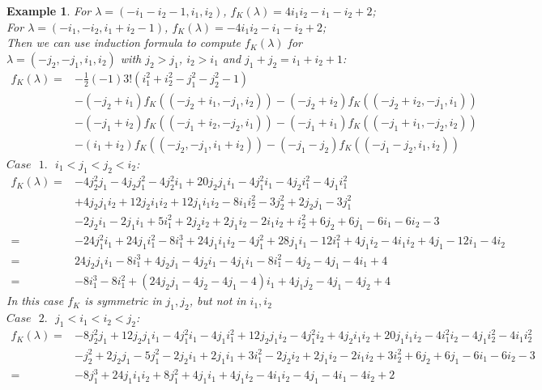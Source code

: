 \documentclass{article}
\newtheorem{example}{Example}[theorem]
\begin{document}
\begin{example}
For $\lambda = (-i_1-i_2-1,i_1,i_2)$, $f_K(\lambda) = 4i_1i_2-i_1-i_2+2$;\\
For $\lambda = (-i_1, -i_2,i_1+i_2-1)$,  $f_K(\lambda) = -4i_1i_2-i_1-i_2+2$;\\
Then we can use induction formula to compute $f_K(\lambda)$ for $\lambda = (-j_2, -j_1, i_1, i_2)$ with $j_2>j_1$, $i_2>i_1$ and $j_1+j_2=i_1+i_2+1$:
\[
\begin{aligned}
f_K(\lambda) = &-\frac{1}{2}(-1)3!(i_1^2+i_2^2-j_1^2-j_2^2-1)\\
			&- (-j_2+i_1)f_K((-j_2+i_1, -j_1,i_2)) - (-j_2+i_2)f_K((-j_2+i_2,-j_1,i_1))\\
			&- (-j_1+i_2)f_K((-j_1+i_2,-j_2,i_1)) - (-j_1+i_1)f_K((-j_1+i_1, -j_2, i_2))\\
			&- (i_1+i_2)f_K((-j_2,-j_1,i_1+i_2)) - (-j_1-j_2)f_K((-j_1-j_2,i_1,i_2))
\end{aligned}
\]
$\mathit{Case\text{ }1.}\text{ } i_1<j_1<j_2<i_2$:
\[
\begin{aligned}
f_K(\lambda) = &-4j_2^2j_1 - 4j_2j_1^2 - 4j_2^2i_1 + 20j_2j_1i_1 - 4j_1^2i_1 - 4j_2i_1^2 - 4j_1i_1^2 \\
&+ 4j_2j_1i_2 + 12j_2i_1i_2 + 12j_1i_1i_2 - 8i_1i_2^2 - 3j_2^2 + 2j_2j_1 - 3j_1^2\\
& - 2j_2i_1 - 2j_1i_1 + 5i_1^2 + 2j_2i_2 + 2j_1i_2 - 2i_1i_2 + i_2^2 + 6j_2 + 6j_1 - 6i_1 - 6i_2 - 3\\
= &-24j_1^2i_1 + 24j_1i_1^2 - 8i_1^3 + 24j_1i_1i_2 - 4j_1^2 + 28j_1i_1 - 12i_1^2 + 4j_1i_2 - 4i_1i_2 + 4j_1 - 12i_1 - 4i_2\\
= &24j_2j_1i_1 - 8i_1^3 + 4j_2j_1 - 4j_2i_1 - 4j_1i_1 - 8i_1^2 - 4j_2 - 4j_1 - 4i_1 + 4\\
= &-8i_1^3-8i_1^2+(24j_2j_1 - 4j_2 - 4j_1 - 4)i_1+4j_1j_2-4j_1-4j_2+4
\end{aligned}
\]
In this case $f_K$ is symmetric in $j_1,j_2$, but not in $i_1,i_2$
\\
$\mathit{Case\text{ }2.}\text{ } j_1<i_1<i_2<j_2$:
\[
\begin{aligned}
f_K(\lambda) = &-8j_2^2j_1 + 12j_2j_1i_1 - 4j_1^2i_1 - 4j_1i_1^2 + 12j_2j_1i_2 - 4j_1^2i_2 + 4j_2i_1i_2 + 20j_1i_1i_2 - 4i_1^2i_2 - 4j_1i_2^2 - 4i_1i_2^2\\
& - j_2^2 + 2j_2j_1 - 5j_1^2 - 2j_2i_1 + 2j_1i_1 + 3i_1^2 - 2j_2i_2 + 2j_1i_2 - 2i_1i_2 + 3i_2^2 + 6j_2 + 6j_1 - 6i_1 - 6i_2 - 3\\
= &-8j_1^3 + 24j_1i_1i_2 + 8j_1^2 + 4j_1i_1 + 4j_1i_2 - 4i_1i_2 - 4j_1 - 4i_1 - 4i_2 + 2\\

\end{aligned}\]
\end{example}
\end{document}
